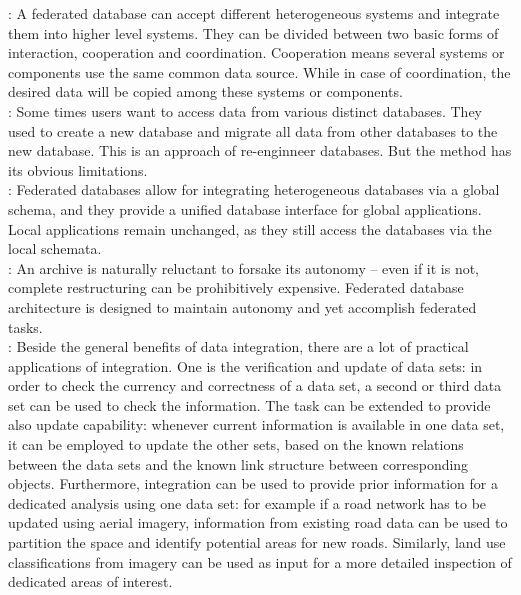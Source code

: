 \documentclass[12pt,a4paper]{report}
\begin{document}
	\citep{Jian}: A federated database can accept different heterogeneous systems and integrate them into higher level systems. They can be divided between two basic forms of interaction, cooperation and coordination. Cooperation means several systems or components use the same common data source. While in case of coordination, the desired data will be copied among these systems or components.
	\\

	\citep{Jian}: Some times users want to access data from various distinct databases. They used to create a new database and migrate all data from other databases to the new database. This is an approach of re-enginneer databases. But the method has its obvious limitations.
	\\

	\citep{Butenuth}: Federated databases allow for integrating heterogeneous databases via a global schema, and they provide a unified database interface for global applications. Local applications remain unchanged, as they still access the databases via the local schemata.
	\\

	\citep{Malik}: An archive is naturally reluctant to forsake its autonomy – even if it is not, complete restructuring can be prohibitively expensive. Federated database architecture is designed to maintain autonomy and yet accomplish federated tasks.
	\\

	\citep{Butenuth}: Beside the general benefits of data integration, there are a lot of practical applications of integration. One is the verification and update of data sets: in order to check the currency and correctness of a data set, a second or third data set can be used to check the information. The task can be extended to provide also update capability: whenever current information is available in one data set, it can be employed to update the other sets, based on the known relations between the data sets and the known link structure between corresponding objects. Furthermore, integration can be used to provide prior information for a dedicated analysis using one data set: for example if a road network has to be updated using aerial imagery, information from existing road data can be used to partition the space and identify potential areas for new roads. Similarly, land use classifications from imagery can be used as input for a more detailed inspection of dedicated areas of interest. 
	\\
\end{document}
